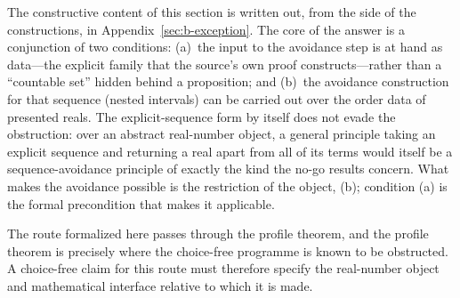 \documentclass[11pt]{article}
\theoremstyle{definition}
\theoremstyle{remark}
\begin{document}
The constructive content of this section is written out, from the side of the constructions, in Appendix~\ref{sec:b-exception}.  The core of the answer is a conjunction of two conditions: (a)~the input to the avoidance step is at hand as data---the explicit family that the source's own proof constructs---rather than a ``countable set'' hidden behind a proposition; and (b)~the avoidance construction for that sequence (nested intervals) can be carried out over the order data of presented reals.  The explicit-sequence form by itself does not evade the obstruction: over an abstract real-number object, a general principle taking an explicit sequence and returning a real apart from all of its terms would itself be a sequence-avoidance principle of exactly the kind the no-go results concern.  What makes the avoidance possible is the restriction of the object, (b); condition (a) is the formal precondition that makes it applicable.

The route formalized here passes through the profile theorem, and the profile theorem is precisely where the choice-free programme is known to be obstructed.  A choice-free claim for this route must therefore specify the real-number object and mathematical interface relative to which it is made.
\end{document}
